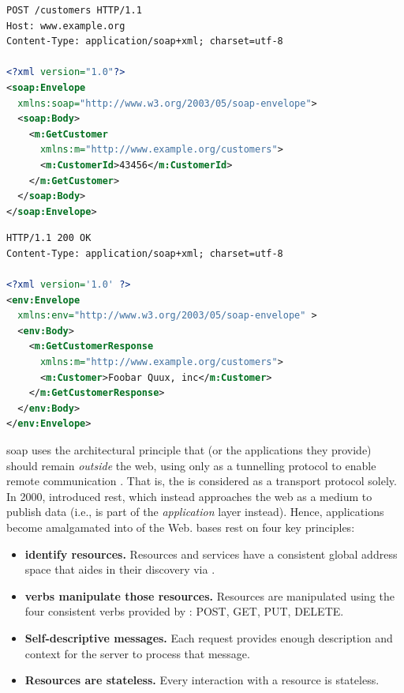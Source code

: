 \begin{samepage}
\begin{lstlisting}[language=xml,label=lst:background:apis:soap-request,caption={[An example SOAP request]A \gls{soap} \glsac{http} POST consumer request to retrieve customer record \#43456 from a web service provider. Source: \citepweb{Ballinger:2014aa}.}]
POST /customers HTTP/1.1
Host: www.example.org
Content-Type: application/soap+xml; charset=utf-8

<?xml version="1.0"?>
<soap:Envelope 
  xmlns:soap="http://www.w3.org/2003/05/soap-envelope">
  <soap:Body>
    <m:GetCustomer 
      xmlns:m="http://www.example.org/customers">
      <m:CustomerId>43456</m:CustomerId>
    </m:GetCustomer>
  </soap:Body>
</soap:Envelope>
\end{lstlisting}
\begin{lstlisting}[language=xml,label=lst:background:apis:soap-response,caption={[An example SOAP response]The \gls{soap} \glsac{http} service provider response for \cref{lst:background:apis:soap-request}. Source: \citepweb{Ballinger:2014aa}.}]
HTTP/1.1 200 OK
Content-Type: application/soap+xml; charset=utf-8

<?xml version='1.0' ?>
<env:Envelope 
  xmlns:env="http://www.w3.org/2003/05/soap-envelope" >
  <env:Body>
    <m:GetCustomerResponse 
      xmlns:m="http://www.example.org/customers">
      <m:Customer>Foobar Quux, inc</m:Customer>
    </m:GetCustomerResponse>
  </env:Body>
</env:Envelope>
\end{lstlisting}
\end{samepage}

\gls{soap} uses the architectural principle that  (or the applications they provide) should remain \textit{outside} the web, using  only as a tunnelling protocol to enable remote communication \citep{Pautasso:2008uw}. That is, the  is considered as a transport protocol solely. In 2000, \citet{Fielding:2000vh} introduced \gls{rest}, which instead approaches the web as a medium to publish data (i.e.,  is part of the \textit{application} layer instead). Hence, applications become amalgamated into of the Web. \citeauthor{Fielding:2000vh} bases \gls{rest} on four key principles:

\begin{itemize}
  \item \textbf{ identify resources.} Resources and services have a consistent global address space that aides in their discovery via  \citep{BernersLee:2004vf}.
  \item \textbf{ verbs manipulate those resources.} Resources are manipulated using the four consistent  verbs provided by : POST, GET, PUT, DELETE.
  \item \textbf{Self-descriptive messages.} Each request provides enough description and context for the server to process that message.
  \item \textbf{Resources are stateless.} Every interaction with a resource is stateless.
\end{itemize}

